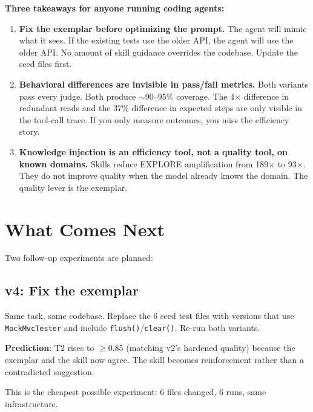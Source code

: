\documentclass[11pt,a4paper]{article}
\begin{document}
\begin{keybox}
\textbf{Three takeaways for anyone running coding agents:}

\begin{enumerate}[leftmargin=1.5em,itemsep=4pt]
  \item \textbf{Fix the exemplar before optimizing the prompt.}
    The agent will mimic what it sees. If the existing tests use the older API,
    the agent will use the older API. No amount of skill guidance overrides
    the codebase. Update the seed files first.

  \item \textbf{Behavioral differences are invisible in pass/fail metrics.}
    Both variants pass every judge. Both produce $\sim$90--95\% coverage.
    The 4$\times$ difference in redundant reads and the 37\% difference
    in expected steps are only visible in the tool-call trace.
    If you only measure outcomes, you miss the efficiency story.

  \item \textbf{Knowledge injection is an efficiency tool, not a quality tool,
    on known domains.}
    Skills reduce EXPLORE amplification from 189$\times$ to 93$\times$.
    They do not improve quality when the model already knows the domain.
    The quality lever is the exemplar.
\end{enumerate}
\end{keybox}

\section{What Comes Next}
\label{sec:next}

Two follow-up experiments are planned:

\subsection*{v4: Fix the exemplar}

Same task, same codebase. Replace the 6 seed test files with versions that use
\texttt{MockMvcTester} and include \texttt{flush()}/\texttt{clear()}.
Re-run both variants.

\textbf{Prediction}: T2 rises to $\geq$0.85 (matching v2's hardened quality)
because the exemplar and the skill now agree. The skill becomes reinforcement
rather than a contradicted suggestion.

This is the cheapest possible experiment: 6 files changed, 6 runs, same infrastructure.
\end{document}
